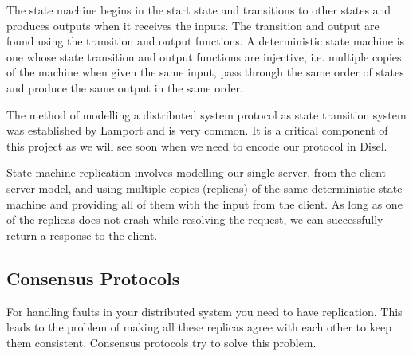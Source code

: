 The state machine begins in the start state and transitions to other states and
produces outputs when it receives the inputs. The transition and output are found
using the transition and output functions. A deterministic state machine is one
whose state transition and output functions are injective, i.e. multiple
copies of the machine when given the same input, pass through the same order of states
and produce the same output in the same order.

The method of modelling a distributed system protocol as state transition system
was established by Lamport \cite{10} and is very common. It is a critical component
of this project as we will see soon when we need to encode our protocol in Disel.

State machine replication involves modelling our single server, from the client
server model, and using multiple copies (replicas) of the same deterministic
state machine and providing all of them with the input from the client.
As long as one of the replicas does not crash while resolving the request,
we can successfully return a response to the client.

%

\subsection{Consensus Protocols}
For handling faults in your distributed system you need to have replication.
This leads to the problem of making all these replicas agree with each other
to keep them consistent. Consensus protocols try to solve this problem.

